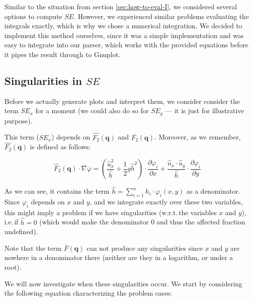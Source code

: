 \documentclass{article}
\newcommand{\pd}[2]{\dfrac{\partial #1}{\partial #2}}
\renewcommand{\phi}{\varphi}
\begin{document}
Similar to the situation from section \ref{sec:how-to-eval-I}, we considered several options to compute $SE$. However, we experienced similar problems evaluating the integrals exactly, which is why we chose a numerical integration. We decided to implement this method ourselves, since it was a simple implementation and was easy to integrate into our parser, which works with the provided equations before it pipes the result through to Gnuplot.%

\subsection{\texorpdfstring{Singularities in $SE$}{Singularities in SE}}
\label{sec:stiffness-analysis-singularities}

Before we actually generate plots and interpret them, we consider consider the term $SE_x$ for a moment (we could also do so for $SE_y$ --- it is just for illustrative purpose).

This term ($SE_x$) depends on $\widehat{F_2}(\mathbf{q})$ and $\overline{F_2}(\mathbf{q})$. Moreover, as we remember, $\widehat{F_2}(\mathbf{q})$ is defined as follows:

\begin{equation*}
  \widehat{F}_2(\mathbf{q}) \cdot \nabla \phi =
  \left( \frac{\widehat{u}_x^2}{\widehat{h}} + \frac{1}{2} g \widehat{h}^2 \right) \cdot \pd{\phi_i}{x} +
  \frac{\widehat{u}_x \cdot \widehat{u}_y }{\widehat{h}} \cdot \pd{\phi_i}{y}
\end{equation*}

As we can see, it contains the term $\widehat{h} = \sum_{i=1}^n h_i \cdot \phi_i(x,y)$ as a denominator. Since $\phi_i$ depends on $x$ and $y$, and we integrate exactly over these two variables, this might imply a problem if we have singularities (w.r.t.\,the variables $x$ and $y$), i.e.\,if $\widehat h = 0$ (which would make the denominator 0 and thus the affected fraction undefined).

Note that the term $\overline{F}(\mathbf{q})$ can not produce any singularities since $x$ and $y$ are nowhere in a denominator there (neither are they in a logarithm, or under a root).

We will now investigate when these singularities occur. We start by considering the following equation characterizing the problem cases:
\end{document}
